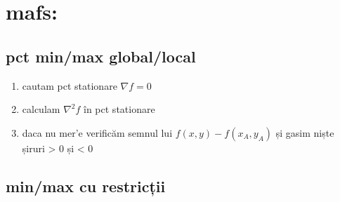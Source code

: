 \documentclass[11pt]{article}
\begin{document}
\section*{mafs:}
\label{sec:org5b5f8fd}
\subsection*{pct min/max global/local}
\label{sec:org723f5e2}
\begin{enumerate}
\item cautam pct stationare \(\nabla f = 0\)
\item calculam \(\nabla^2 f\) în pct stationare
\item daca nu mer'e verificăm semnul lui \(f(x, y) - f(x_A, y_A)\) și gasim niște șiruri > 0 și < 0
\end{enumerate}
\subsection*{min/max cu restricții}
\label{sec:org24c545d}
\end{document}
